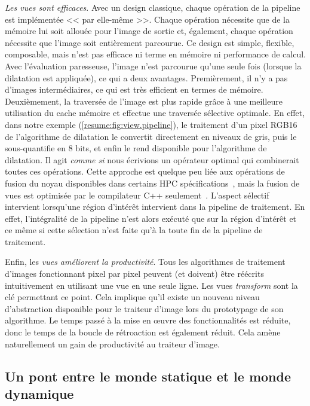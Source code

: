 \emph{Les vues sont efficaces}. Avec un design classique, chaque opération de la pipeline est implémentée << par
elle-même >>. Chaque opération nécessite que de la mémoire lui soit allouée pour l'image de sortie et, également, chaque
opération nécessite que l'image soit entièrement parcourue. Ce design est simple, flexible, composable, mais n'est pas
efficace ni terme en mémoire ni performance de calcul. Avec l'évaluation paresseuse, l'image n'est parcourue qu'une
seule fois (lorsque la dilatation est appliquée), ce qui a deux avantages. Premièrement, il n'y a pas d'images
intermédiaires, ce qui est très efficient en termes de mémoire. Deuxièmement, la traversée de l'image est plus rapide
grâce à une meilleure utilisation du cache mémoire et effectue une traversée sélective optimale. En effet, dans notre
exemple (\cref{resume:fig:view.pipeline}), le traitement d'un pixel RGB16 de l'algorithme de dilatation le convertit
directement en niveaux de gris, puis le sous-quantifie en 8 bits, et enfin le rend disponible pour l'algorithme de
dilatation. Il agit \emph{comme si} nous écrivions un opérateur optimal qui combinerait toutes ces opérations. Cette
approche est quelque peu liée aux opérations de fusion du noyau disponibles dans certains HPC
spécifications~\parencite{openvx.2019}, mais la fusion de vues est optimisée par le compilateur C++
seulement~\parencite{brown.2018.ranges}. L'aspect sélectif intervient lorsqu'une région d'intérêt intervient dans la
pipeline de traitement. En effet, l'intégralité de la pipeline n'est alors exécuté que sur la région d'intérêt et ce
même si cette sélection n'est faite qu'à la toute fin de la pipeline de traitement.

Enfin, les \emph{vues améliorent la productivité}. Tous les algorithmes de traitement d'images fonctionnant pixel par
pixel peuvent (et doivent) être réécrits intuitivement en utilisant une vue en une seule ligne. Les vues
\emph{transform} sont la clé permettant ce point. Cela implique qu'il existe un nouveau niveau d'abstraction disponible
pour le traiteur d'image lors du prototypage de son algorithme. Le temps passé à la mise en \oe{}uvre des
fonctionnalités est réduite, donc le temps de la boucle de rétroaction est également réduit. Cela amène naturellement un
gain de productivité au traiteur d'image.


\subsection*{Un pont entre le monde statique et le monde dynamique}



